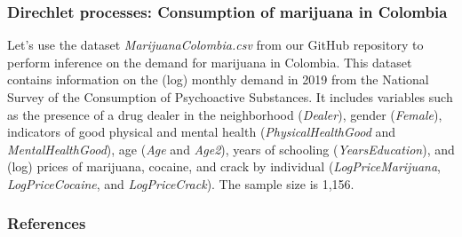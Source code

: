 \documentclass[12pt, compress]{beamer}
\begin{document}
\begin{frame}
	\frametitle{Direchlet processes: Consumption of marijuana in Colombia}
Let's use the dataset \textit{MarijuanaColombia.csv} from our GitHub repository to perform inference on the demand for marijuana in Colombia. This dataset contains information on the (log) monthly demand in 2019 from the National Survey of the Consumption of Psychoactive Substances. It includes variables such as the presence of a drug dealer in the neighborhood (\textit{Dealer}), gender (\textit{Female}), indicators of good physical and mental health (\textit{PhysicalHealthGood} and \textit{MentalHealthGood}), age (\textit{Age} and \textit{Age2}), years of schooling (\textit{YearsEducation}), and (log) prices of marijuana, cocaine, and crack by individual (\textit{LogPriceMarijuana}, \textit{LogPriceCocaine}, and \textit{LogPriceCrack}). The sample size is 1,156. 
\end{frame}

\begin{frame}[allowframebreaks]
	\frametitle{References}
		{\footnotesize
		
		}
\end{frame}
\end{document}
